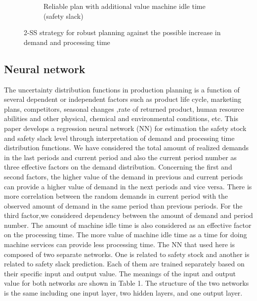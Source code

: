 \documentclass[letterpaper]{article} %
\begin{document}
\begin{figure}[t]
\begin{subfigure}{.46\textwidth}
  \caption{Reliable plan with additional value machine idle time (safety slack)}
  \label{fig:fig1-3}
\end{subfigure}
\caption{2-SS strategy for robust planning against the possible increase in demand and processing time}
\label{fig2}
\end{figure}

\subsection{Neural network}
The uncertainty distribution functions in production planning is a function of several  dependent or independent factors such as product life cycle, marketing plans, competitors, seasonal changes ,rate of returned product, human resource abilities and other physical, chemical and environmental conditions, etc. 
This paper develops a regression neural network (NN) for estimation the safety stock and safety slack level through interpretation of demand and processing time distribution functions. We have considered the total amount of realized demands in the last periods and current period and also the current period number as three effective factors on the demand distribution. Concerning the first and second factors, the higher value of the demand in previous and current periods can provide a higher value of demand in the next periods and vice versa. There is more correlation between the random demands in current period with the observed amount of demand in the same period than previous periods. For the third factor,we considered dependency between the amount of demand and period number. The amount of machine idle time is also considered as an effective factor on the processing time. The more value of machine idle time as a time for doing machine services can provide less processing time. The NN that used here is composed of two separate networks. One is related to safety stock and another is related to safety slack prediction. Each of them are trained separately based on their specific input and output value. The meanings of the input and output value for both networks are shown in Table 1. The structure of the two networks is the same including one input layer, two hidden layers, and one output layer.
\end{document}
